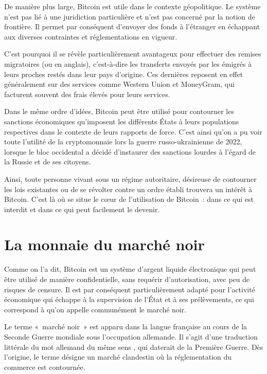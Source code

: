 De manière plus large, Bitcoin est utile dans le contexte géopolitique. Le système n'est pas lié à une juridiction particulière et n'est pas concerné par la notion de frontière. Il permet par conséquent d'envoyer des fonds à l'étranger en échappant aux diverses contraintes et réglementations en vigueur.

C'est pourquoi il se révèle particulièrement avantageux pour effectuer des remises migratoires (ou  en anglais), c'est-à-dire les transferts envoyés par les émigrés à leurs proches restés dans leur pays d'origine. Ces dernières reposent en effet généralement sur des services comme Western Union et MoneyGram, qui facturent souvent des frais élevés pour leurs services.

Dans le même ordre d'idées, Bitcoin peut être utilisé pour contourner les sanctions économiques qu'imposent les différents États à leurs populations respectives dans le contexte de leurs rapports de force. C'est ainsi qu'on a pu voir toute l'utilité de la cryptomonnaie lors la guerre russo-ukrainienne de 2022, lorsque le bloc occidental a décidé d'instaurer des sanctions lourdes à l'égard de la Russie et de ses citoyens.

Ainsi, toute personne vivant sous un régime autoritaire, désireuse de contourner les lois existantes ou de se révolter contre un ordre établi trouvera un intérêt à Bitcoin. C'est là où se situe le cœur de l'utilisation de Bitcoin~: dans ce qui est interdit et dans ce qui peut facilement le devenir.


\section*{La monnaie du marché noir}

Comme on l'a dit, Bitcoin est un système d'argent liquide électronique qui peut être utilisé de manière confidentielle, sans requérir d'autorisation, avec peu de risques de censure. Il est par conséquent particulièrement adapté pour l'activité économique qui échappe à la supervision de l'État et à ses prélèvements, ce qui correspond à qu'on appelle communément le marché noir.


Le terme «~marché noir~» est apparu dans la langue française au cours de la Seconde Guerre mondiale sous l'occupation allemande. Il s'agit d'une traduction littérale du mot allemand du même sens , qui daterait de la Première Guerre. Dès l'origine, le terme désigne un marché clandestin où la réglementation du commerce est contournée.

